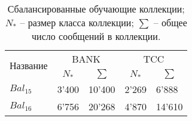 \begin{table}[htp!]
\centering
\caption{Сбалансированные обучающие коллекции;
    $N_*$ -- размер класса коллекции;
    $\sum$ -- общее число сообщений в коллекции.
}
\label{table:balancedTrainCollections}
\begin{tabular}{lllll}
\hline
\multirow{2}{*}{Название} & \multicolumn{2}{c}{BANK}                               & \multicolumn{2}{c}{TCC}                                \\
                          & \multicolumn{1}{c}{$N_*$} & \multicolumn{1}{c}{$\sum$} & \multicolumn{1}{c}{$N_*$} & \multicolumn{1}{c}{$\sum$} \\ \hline
$Bal_{15}$                & 3'400                     & 10'400                     & 2'269                     & 6'888                      \\
$Bal_{16}$                & 6'756                     & 20'268                     & 4'870                     & 14'610                     \\ \hline
\end{tabular}
\end{table}
